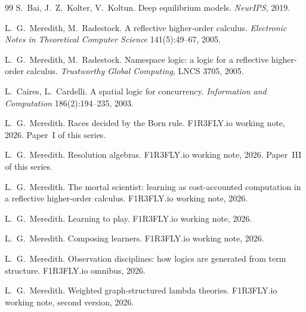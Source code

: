 \documentclass[11pt,a4paper]{article}
\theoremstyle{plain}
\theoremstyle{definition}
\theoremstyle{remark}
\begin{document}
\begin{thebibliography}{99}
S.~Bai, J.~Z.~Kolter, V.~Koltun. Deep equilibrium models. \emph{NeurIPS}, 2019.

L.~G.~Meredith, M.~Radestock. A reflective higher-order calculus.
\emph{Electronic Notes in Theoretical Computer Science} 141(5):49--67, 2005.

L.~G.~Meredith, M.~Radestock. Namespace logic: a logic for a reflective
higher-order calculus. \emph{Trustworthy Global Computing}, LNCS 3705, 2005.

L.~Caires, L.~Cardelli. A spatial logic for concurrency.
\emph{Information and Computation} 186(2):194--235, 2003.

L.~G.~Meredith. Races decided by the Born rule. F1R3FLY.io working note,
2026. Paper~I of this series.

L.~G.~Meredith. Resolution algebras. F1R3FLY.io working note, 2026.
Paper~III of this series.

L.~G.~Meredith. The mortal scientist: learning as cost-accounted computation in
a reflective higher-order calculus. F1R3FLY.io working note, 2026.

L.~G.~Meredith. Learning to play. F1R3FLY.io working note, 2026.

L.~G.~Meredith. Composing learners. F1R3FLY.io working note, 2026.

L.~G.~Meredith. Observation disciplines: how logics are generated from term
structure. F1R3FLY.io omnibus, 2026.

L.~G.~Meredith. Weighted graph-structured lambda theories. F1R3FLY.io working
note, second version, 2026.

\end{thebibliography}
\end{document}
